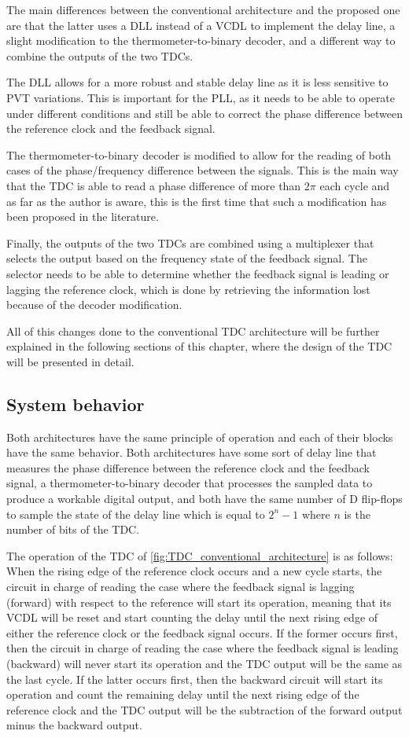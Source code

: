The main differences between the conventional architecture and the proposed one are that the latter uses a DLL instead of a VCDL to implement the delay line, a slight modification
to the thermometer-to-binary decoder, and a different way to combine the outputs of the two TDCs.

The DLL allows for a more robust and stable delay line as it is less sensitive to PVT variations. This is important for the PLL, as it needs to be able to operate under different
conditions and still be able to correct the phase difference between the reference clock and the feedback signal.

The thermometer-to-binary decoder is modified to allow for the reading of both cases of the phase/frequency difference between the signals. This is the main way that the TDC is able
to read a phase difference of more than 2$\pi$ each cycle and as far as the author is aware, this is the first time that such a modification has been proposed in the literature.

Finally, the outputs of the two TDCs are combined using a multiplexer that selects the output based on the frequency state of the feedback signal. The selector needs to be able to
determine whether the feedback signal is leading or lagging the reference clock, which is done by retrieving the information lost because of the decoder modification.


All of this changes done to the conventional TDC architecture will be further explained in the following sections of this chapter, where the design of the TDC will be presented in 
detail.

\subsection{System behavior}
Both architectures have the same principle of operation and each of their blocks have the same behavior. Both architectures have some sort of delay line that measures the phase difference
between the reference clock and the feedback signal, a thermometer-to-binary decoder that processes the sampled data to produce a workable digital output, and both have the same number of 
D flip-flops to sample the state of the delay line which is equal to $2^n-1$ where $n$ is the number of bits of the TDC.

The operation of the TDC of \ref{fig:TDC_conventional_architecture} is as follows: When the rising edge of the reference clock occurs and a new cycle starts, the circuit in charge of reading the case where the feedback signal is lagging (forward) with 
respect to the reference will start its operation, meaning that its VCDL will be reset and start counting the delay until the next rising edge of either the reference clock or the feedback signal
occurs. If the former occurs first, then the circuit in charge of reading the case where the feedback signal is leading (backward) will never start its operation and the TDC output will be the
same as the last cycle. If the latter occurs first, then the backward circuit will start its operation and count the remaining delay until the next rising edge of the reference clock and the TDC
output will be the subtraction of the forward output minus the backward output.

